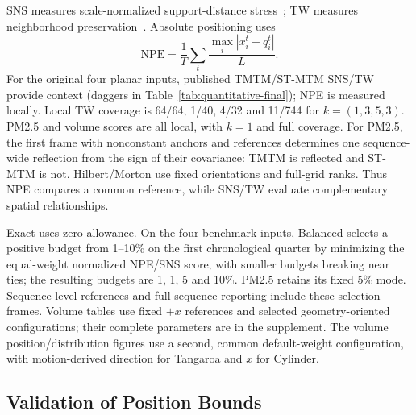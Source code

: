 SNS measures scale-normalized support-distance stress~\cite{Smelser:2025:Scale}; TW measures neighborhood preservation~\cite{Venna:2001:NP}. Absolute positioning uses
\begin{equation}\label{eq:experimental-npe}
\mathrm{NPE}=\frac1T\sum_t\frac{\max_i|x_i^t-q_i^t|}{L}.
\end{equation}
For the original four planar inputs, published TMTM/ST-MTM SNS/TW provide context (daggers in Table~\ref{tab:quantitative-final}); NPE is measured locally. Local TW coverage is 64/64, 1/40, 4/32 and 11/744 for $k=(1,3,5,3)$. PM2.5 and volume scores are all local, with $k=1$ and full coverage. For PM2.5, the first frame with nonconstant anchors and references determines one sequence-wide reflection from the sign of their covariance: TMTM is reflected and ST-MTM is not. Hilbert/Morton use fixed orientations and full-grid ranks. Thus NPE compares a common reference, while SNS/TW evaluate complementary spatial relationships.

Exact uses zero allowance. On the four benchmark inputs, Balanced selects a positive budget from 1--10\% on the first chronological quarter by minimizing the equal-weight normalized NPE/SNS score, with smaller budgets breaking near ties; the resulting budgets are 1, 1, 5 and 10\%. PM2.5 retains its fixed 5\% mode. Sequence-level references and full-sequence reporting include these selection frames. Volume tables use fixed $+x$ references and selected geometry-oriented configurations; their complete parameters are in the supplement. The volume position/distribution figures use a second, common default-weight configuration, with motion-derived direction for Tangaroa and $x$ for Cylinder.

\begin{figure}[!t]
\end{figure}
\subsection{Validation of Position Bounds}\label{sec:bounds-eval}

